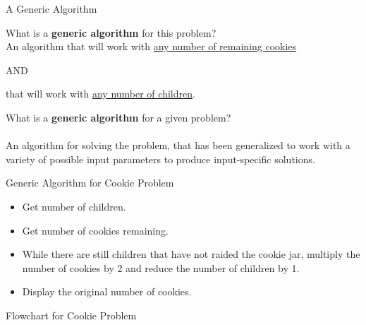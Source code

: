 \documentclass[graphics]{beamer}
\begin{document}
\begin{frame}{A Generic Algorithm}
     {
        What is a \textbf{generic algorithm} for this problem? \\
        An algorithm that will work with \underline{any number of remaining cookies}
        \begin{center}
    				        AND
    	\end{center}
    	that will work with \underline{any number of children}.
	}
	 {
	    What is a \textbf{generic algorithm} for a given problem? \\ ~~ \\
	    
	    An algorithm for solving the problem, that has been generalized to work with a variety of possible input parameters to produce input-specific solutions.
	}
\end{frame}

\begin{frame}{Generic Algorithm for Cookie Problem}
    \begin{itemize}
        \item Get number of children.
        \item Get number of cookies remaining.
        \item While there are still children that have not raided the cookie jar, multiply the number of cookies by 2 and reduce the number of children by 1.
        \item Display the original number of cookies.
    \end{itemize}
\end{frame}

\begin{frame}{Flowchart for Cookie Problem}
    \centering
    
\end{frame}
\end{document}
